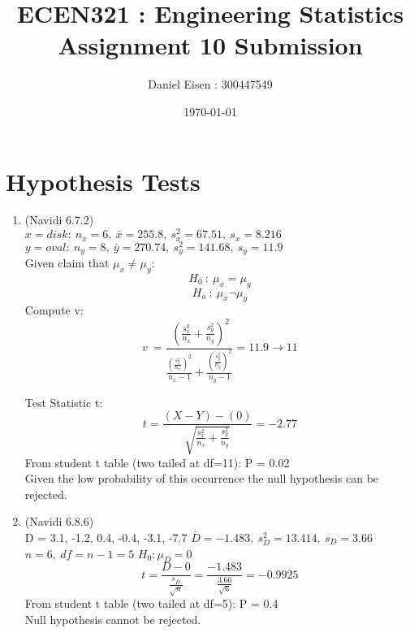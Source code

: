 \documentclass[11pt]{article}
\title{ECEN321 : Engineering Statistics \\ Assignment 10 Submission}
\author{Daniel Eisen : 300447549}
\date{\today}
\begin{document}
\maketitle
\section*{Hypothesis Tests}
\begin{enumerate}
        \item (Navidi 6.7.2) \\
        $x=disk:\:n_x = 6,\: \bar{x} = 255.8,\: s^2_x = 67.51,\: s_x = 8.216$ \\
        $y=oval:\:n_y = 8,\: \bar{y}= 270.74,\: s^2_y = 141.68,\: s_y =11.9$ \\

        Given claim that $\mu_x \neq \mu_y$:
        $$H_0\::\:\mu_x = \mu_y$$
        $$H_a\::\:\mu_x \neg \mu_y$$
        Compute v:
        $$v\ =\frac{\ \left(\frac{s_{x}^{2}}{n_{x}}+\frac{s_{y}^{2}}{n_{y}}\right)^{2}}{\frac{\left(\frac{s_{x}^{2}}{n_{x}}\right)^{2}}{n_{x}-1}+\frac{\left(\frac{s_{y}^{2}}{n_{y}}\right)^{2}}{n_{y}-1}} = 11.9 \rightarrow 11$$

        Test Statistic t:
        $$t=\frac{\left(X-Y\right)-\left(0\right)}{\sqrt{\frac{s_{x}^{2}}{n_{x}}+\frac{s_{y}^{2}}{n_{y}}}} = -2.77$$
        From student t table (two tailed at df=11): P = 0.02 \\
        Given the low probability of this occurrence the null hypothesis can be rejected.
        \item (Navidi 6.8.6) \\
        D = 3.1, -1.2, 0.4, -0.4, -3.1, -7.7
        $\bar{D} = -1.483,\: s^2_D = 13.414,\: s_D = 3.66$ \\
        $n = 6,\: df = n-1=5$
        $H_0 : \mu_D = 0$
        $$t=\frac{D-0}{\frac{s_{\bar{D}}}{\sqrt{n}}} =\frac{-1.483}{\frac{3.66}{\sqrt{6}}} = -0.9925$$
        From student t table (two tailed at df=5): P = 0.4 \\
        Null hypothesis cannot be rejected.
        

\end{enumerate}
\end{document}
